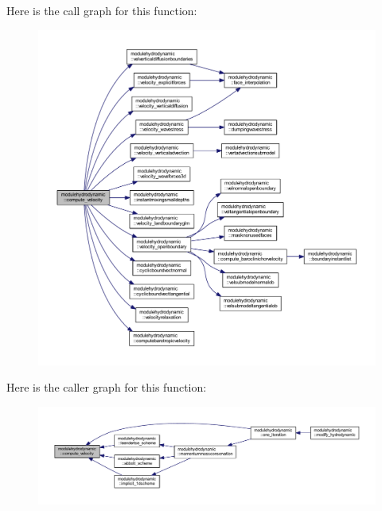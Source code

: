 Here is the call graph for this function\+:\nopagebreak
\begin{figure}[H]
\begin{center}
\leavevmode
\includegraphics[width=350pt]{namespacemodulehydrodynamic_aba4d9045d33fdc1b7b6011fd3fbb9c28_cgraph}
\end{center}
\end{figure}
Here is the caller graph for this function\+:\nopagebreak
\begin{figure}[H]
\begin{center}
\leavevmode
\includegraphics[width=350pt]{namespacemodulehydrodynamic_aba4d9045d33fdc1b7b6011fd3fbb9c28_icgraph}
\end{center}
\end{figure}
\mbox{\label{namespacemodulehydrodynamic_a264a587e27769271754a3a3a8979a9b8}} 
